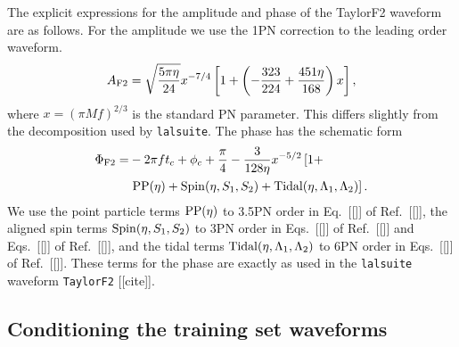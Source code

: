 \documentclass[prd,aps,letter,twocolumn,floatfix,notitlepage,nofootinbib]{revtex4-1}
\begin{document}
%

The explicit expressions for the amplitude and phase of the TaylorF2 waveform are as follows. For the amplitude we use the 1PN correction to the leading order waveform.
\begin{equation}
A_{\rm F2} = \sqrt{\frac{5\pi\eta}{24}} x^{-7/4} \left[ 1 + \left(-\frac{323}{224} + \frac{451\eta}{168} \right)x \right],
\end{equation}
where $x=(\pi M f)^{2/3}$ is the standard PN parameter. This differs slightly from the decomposition used by \texttt{lalsuite}. The phase has the schematic form
\begin{align}
\Phi_{\rm F2} =& -2\pi f t_c + \phi_c + \frac{\pi}{4} - \frac{3}{128\eta}x^{-5/2} \left[1 + \right. \\
                        & \left. {\rm PP}(\eta) + {\rm Spin}(\eta, S_1, S_2) + {\rm Tidal}(\eta, \Lambda_1, \Lambda_2)  \right].
\end{align}
We use the point particle terms ${\rm PP}(\eta)$ to 3.5PN order in Eq.~[[]] of Ref.~[[]], the aligned spin terms ${\rm Spin}(\eta, S_1, S_2)$ to 3PN order in Eqs.~[[]] of Ref.~[[]] and Eqs.~[[]] of Ref.~[[]], and the tidal terms ${\rm Tidal}(\eta, \Lambda_1, \Lambda_2)$ to 6PN order in Eqs.~[[]] of Ref.~[[]]. These terms for the phase are exactly as used in the \texttt{lalsuite} waveform \texttt{TaylorF2} [[cite]].




\subsection{Conditioning the training set waveforms}
\end{document}

